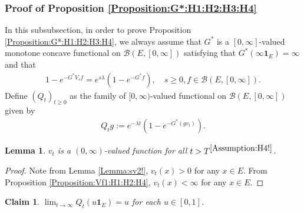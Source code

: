 \documentclass[12pt,a4paper]{amsart}
\numberwithin{equation}{section}
\theoremstyle{plain}
\newtheorem{lem}[thm]{Lemma}
\newtheorem{claim}[thm]{Claim}
\theoremstyle{definition}
\theoremstyle{remark}
\newcounter{N}
\newcounter{n}[N]
\begin{document}
\subsubsection{Proof of Proposition \ref{Proposition:G*:H1:H2:H3:H4}} \label{sec:G*}

	In this subsubsection, in order to prove Proposition \ref{Proposition:G*:H1:H2:H3:H4}, we always assume that $G^*$ is a $[0,\infty]$-valued monotone concave functional on $\mathcal B(E,[0,\infty])$ satisfying that $G^*(\infty \mathbf 1_E) = \infty$ and that 
\begin{align}
  1 - e^{- G^* V_sf} 
  = e^{s\lambda} (1- e^{- G^* f}),
  \quad s \geq 0, f \in \mathcal B(E, [0,\infty]).
  \end{align}
Define $(Q_t)_{t\geq 0}$ as the family of $[0,\infty)$-valued functional on $\mathcal B(E,[0,\infty])$ given by
\begin{align}
 Q_tg 
:= e^{- \lambda t}( 1 - e^{-G^*(gv_t)} ).
 \end{align}
\begin{lem} \label{Lemma:vp:H1:H2:H3:H4} 
$v_t$ is a $(0,\infty)$-valued function for all $t> T^{\ref{Assumption:H4!}}$.
\end{lem}
\begin{proof}  
Note from Lemma \ref{Lemma:sv2!}, $v_t(x)>0$ for any $x\in E$.
From Proposition \ref{Proposition:Vf1:H1:H2:H4}, $v_t(x)<\infty$ for any $x\in E$.
\end{proof}
\begin{claim} \label{Claim:GQ:H1:H2:H3:H4} 
 $\lim_{t\to \infty} Q_t(u \mathbf 1_E) = u$ for each $u\in [0,1]$.
\end{claim}
\end{document}
